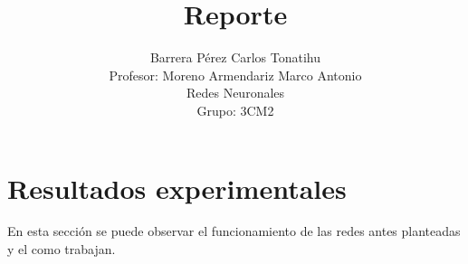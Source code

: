 \documentclass[12pt, titlepage]{article}
\title{Reporte}
\author{Barrera Pérez Carlos Tonatihu \\ Profesor: Moreno Armendariz Marco Antonio \\ Redes Neuronales \\ Grupo: 3CM2 }
\begin{document}
    \maketitle
    \tableofcontents
    \newpage
    \section{Resultados experimentales}
    En esta sección se puede observar el funcionamiento de las redes antes planteadas y el como trabajan.
    
    
    
    
\end{document}
